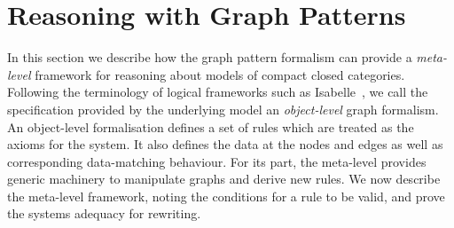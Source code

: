 \documentclass[runningheads]{llncs}
\newcommand{\binterp}[1]{\llbracket #1 \rrbracket_!}
\begin{document}

%
%

%








\section{Reasoning with Graph Patterns}
\label{sec:rewriting}

In this section we describe how the graph pattern formalism can
provide a \emph{meta-level} framework for reasoning about models of
compact closed categories. Following the terminology of logical
frameworks such as Isabelle~\cite{isabelle}, we call the specification
provided by the underlying model an \emph{object-level} graph
formalism. An object-level formalisation defines a set of rules which
are treated as the axioms for the system. It also defines the data at
the nodes and edges as well as corresponding data-matching behaviour.
For its part, the meta-level provides generic machinery to manipulate
graphs and derive new rules. We now describe the meta-level framework,
noting the conditions for a rule to be valid, and prove the systems
adequacy for rewriting.
\end{document}
